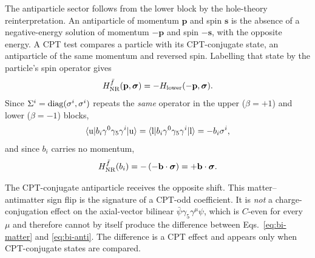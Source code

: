 \documentclass[
  aps,
  prd,
  reprint,
  amsmath,
  amssymb,
  nofootinbib,
  superscriptaddress,
  floatfix
]{revtex4-2}
\newcommand{\sig}{\bm{\sigma}}
\begin{document}
The antiparticle sector follows from the lower block by the hole-theory
reinterpretation. An antiparticle of momentum $\mathbf p$ and spin
$\mathbf s$ is the absence of a negative-energy solution of momentum
$-\mathbf p$ and spin $-\mathbf s$, with the opposite energy. A CPT test
compares a particle with its CPT-conjugate state, an antiparticle of the
same momentum and reversed spin. Labelling that state by the particle's
spin operator gives
\begin{equation}
  H^{\bar f}_{\rm NR}(\mathbf p,\sig) = -H_{\rm lower}(-\mathbf p,\sig).
  \label{eq:anti-rule}
\end{equation}
Since $\Sigma^i={\rm diag}(\sigma^i,\sigma^i)$ repeats the \emph{same}
operator in the upper ($\beta=+1$) and lower ($\beta=-1$) blocks,
\begin{equation}
  \langle{\rm u}|b_i\gamma^0\gamma_5\gamma^i|{\rm u}\rangle
  = \langle{\rm l}|b_i\gamma^0\gamma_5\gamma^i|{\rm l}\rangle
  = -b_i\sigma^i ,
  \label{eq:bi-block}
\end{equation}
and since $b_i$ carries no momentum,
\begin{equation}
  H^{\bar f}_{\rm NR}(b_i)
  = -\left(-\mathbf{b}\cdot\sig\right) = +\mathbf{b}\cdot\sig .
  \label{eq:bi-anti}
\end{equation}

The CPT-conjugate antiparticle receives the opposite shift. This
matter--antimatter sign flip is the signature of a CPT-odd coefficient. It is \emph{not} a charge-conjugation effect on the
axial-vector bilinear $\bar\psi\gamma_5\gamma^\mu\psi$, which is $C$-even
for every $\mu$ and therefore cannot by itself produce the difference
between Eqs.~\eqref{eq:bi-matter} and \eqref{eq:bi-anti}. The difference is
a CPT effect and appears only when CPT-conjugate states are compared.
\end{document}
